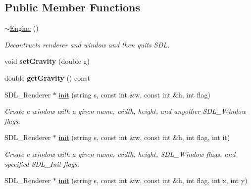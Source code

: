 \subsection*{Public Member Functions}
\begin{DoxyCompactItemize}
\item 
\hyperlink{classEngine_a8ef7030a089ecb30bbfcb9e43094717a}{$\sim$\+Engine} ()\hypertarget{classEngine_a8ef7030a089ecb30bbfcb9e43094717a}{}\label{classEngine_a8ef7030a089ecb30bbfcb9e43094717a}

\begin{DoxyCompactList}\small\item\em Decontructs renderer and window and then quits S\+DL. \end{DoxyCompactList}\item 
void {\bfseries set\+Gravity} (double g)\hypertarget{classEngine_ac2dab34eea67e7a2c006945ee71a9e42}{}\label{classEngine_ac2dab34eea67e7a2c006945ee71a9e42}

\item 
double {\bfseries get\+Gravity} () const \hypertarget{classEngine_ae0228c54bc903edc9cc149213b121b65}{}\label{classEngine_ae0228c54bc903edc9cc149213b121b65}

\item 
S\+D\+L\+\_\+\+Renderer $\ast$ \hyperlink{classEngine_af02c5fcfad817c5c8bc0a3cacfd9d4f8}{init} (string s, const int \&w, const int \&h, int flag)\hypertarget{classEngine_af02c5fcfad817c5c8bc0a3cacfd9d4f8}{}\label{classEngine_af02c5fcfad817c5c8bc0a3cacfd9d4f8}

\begin{DoxyCompactList}\small\item\em Create a window with a given name, width, height, and anyother S\+D\+L\+\_\+\+Window flags. \end{DoxyCompactList}\item 
S\+D\+L\+\_\+\+Renderer $\ast$ \hyperlink{classEngine_aca16d18226665d75acad41b48a8da989}{init} (string s, const int \&w, const int \&h, int flag, int it)\hypertarget{classEngine_aca16d18226665d75acad41b48a8da989}{}\label{classEngine_aca16d18226665d75acad41b48a8da989}

\begin{DoxyCompactList}\small\item\em Create a window with a given name, width, height, S\+D\+L\+\_\+\+Window flags, and specified S\+D\+L\+\_\+\+Init flags. \end{DoxyCompactList}\item 
S\+D\+L\+\_\+\+Renderer $\ast$ \hyperlink{classEngine_a4f80e210f2ae48208eed4ad17c309120}{init} (string s, const int \&w, const int \&h, int flag, int x, int y)\hypertarget{classEngine_a4f80e210f2ae48208eed4ad17c309120}{}\label{classEngine_a4f80e210f2ae48208eed4ad17c309120}


\end{DoxyCompactItemize}

